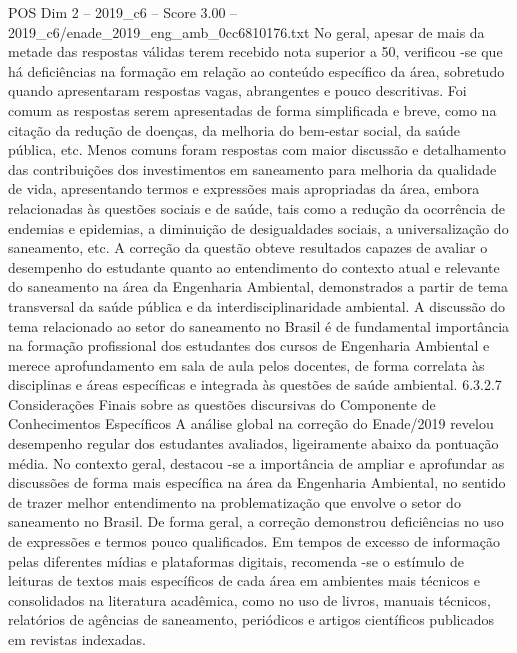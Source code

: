 \begin{textsample}{POS Dim 2 – 2019\_c6 – Score 3.00 – 2019\_c6/enade\_2019\_eng\_amb\_0cc6810176.txt}
No geral, apesar de mais da metade das respostas válidas terem recebido nota superior a 50, verificou -se que há deficiências na formação em relação ao conteúdo específico da área, sobretudo quando apresentaram respostas vagas, abrangentes e pouco descritivas.
Foi comum as respostas serem apresentadas de forma simplificada e breve, como na citação da redução de doenças, da melhoria do bem-estar social, da saúde pública, etc.
Menos comuns foram respostas com maior discussão e detalhamento das contribuições dos investimentos em saneamento para melhoria da qualidade de vida, apresentando termos e expressões mais apropriadas da área, embora relacionadas às questões sociais e de saúde, tais como a redução da ocorrência de endemias e epidemias, a diminuição de desigualdades sociais, a universalização do saneamento, etc.
A correção da questão obteve resultados capazes de avaliar o desempenho do estudante quanto ao entendimento do contexto atual e relevante do saneamento na área da Engenharia Ambiental, demonstrados a partir de tema transversal da saúde pública e da interdisciplinaridade ambiental.
A discussão do tema relacionado ao setor do saneamento no Brasil é de fundamental importância na formação profissional dos estudantes dos cursos de Engenharia Ambiental e merece aprofundamento em sala de aula pelos docentes, de forma correlata às disciplinas e áreas específicas e integrada às questões de saúde ambiental. 6.3.2.7 Considerações Finais sobre as questões discursivas do Componente de Conhecimentos Específicos A análise global na correção do Enade/2019 revelou desempenho regular dos estudantes avaliados, ligeiramente abaixo da pontuação média.
No contexto geral, destacou -se a importância de ampliar e aprofundar as discussões de forma mais específica na área da Engenharia Ambiental, no sentido de trazer melhor entendimento na problematização que envolve o setor do saneamento no Brasil.
De forma geral, a correção demonstrou deficiências no uso de expressões e termos pouco qualificados.
Em tempos de excesso de informação pelas diferentes mídias e plataformas digitais, recomenda -se o estímulo de leituras de textos mais específicos de cada área em ambientes mais técnicos e consolidados na literatura acadêmica, como no uso de livros, manuais técnicos, relatórios de agências de saneamento, periódicos e artigos científicos publicados em revistas indexadas.

\end{textsample}
